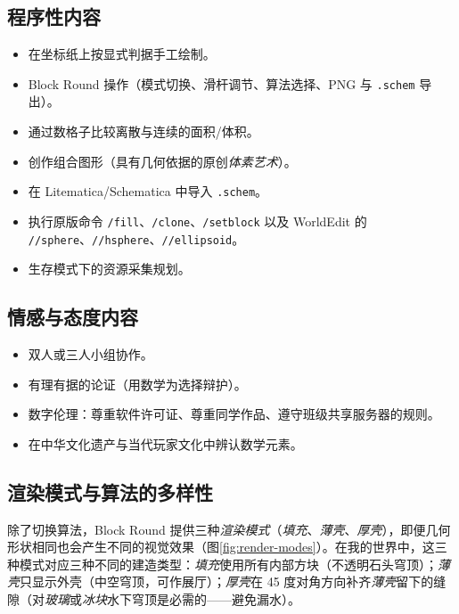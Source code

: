 \documentclass[12pt,a4paper]{scrartcl}
\newcommand{\cmd}[1]{\textcolor{earth}{\texttt{\small #1}}}
\begin{document}
\subsection{程序性内容}
\begin{itemize}[leftmargin=1.3em,itemsep=0.15em,topsep=0.3em]
  \item 在坐标纸上按显式判据手工绘制。
  \item Block Round 操作（模式切换、滑杆调节、算法选择、PNG 与 \texttt{.schem} 导出）。
  \item 通过数格子比较离散与连续的面积/体积。
  \item 创作组合图形（具有几何依据的原创\emph{体素艺术}）。
  \item 在 Litematica/Schematica 中导入 \texttt{.schem}。
  \item 执行原版命令 \cmd{/fill}、\cmd{/clone}、\cmd{/setblock} 以及 WorldEdit 的 \cmd{//sphere}、\cmd{//hsphere}、\cmd{//ellipsoid}。
  \item 生存模式下的资源采集规划。
\end{itemize}

\subsection{情感与态度内容}
\begin{itemize}[leftmargin=1.3em,itemsep=0.15em,topsep=0.3em]
  \item 双人或三人小组协作。
  \item 有理有据的论证（用数学为选择辩护）。
  \item 数字伦理：尊重软件许可证、尊重同学作品、遵守班级共享服务器的规则。
  \item 在中华文化遗产与当代玩家文化中辨认数学元素。
\end{itemize}

\subsection{渲染模式与算法的多样性}

除了切换算法，Block Round 提供三种\emph{渲染模式}（\emph{填充}、\emph{薄壳}、\emph{厚壳}），即便几何形状相同也会产生不同的视觉效果（图\ref{fig:render-modes}）。在我的世界中，这三种模式对应三种不同的建造类型：\emph{填充}使用所有内部方块（不透明石头穹顶）；\emph{薄壳}只显示外壳（中空穹顶，可作展厅）；\emph{厚壳}在 45 度对角方向补齐\emph{薄壳}留下的缝隙（对\emph{玻璃}或\emph{冰块}水下穹顶是必需的——避免漏水）。
\end{document}
